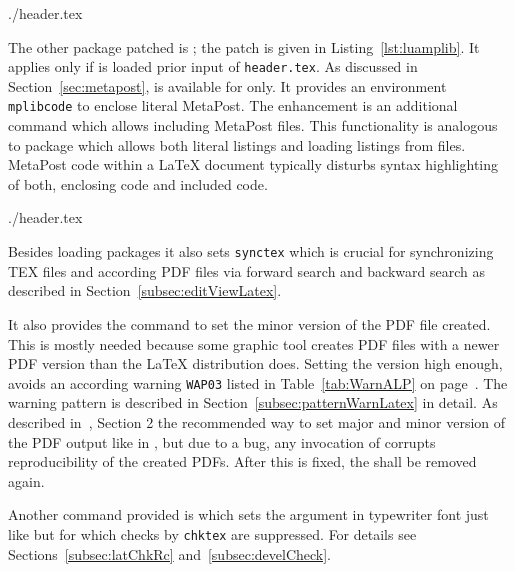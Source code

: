 %
{./header.tex}%


The other package patched is ; the patch is given in Listing~\ref{lst:luamplib}. 
It applies only if  is loaded prior input of \texttt{header.tex}. 
As discussed in Section~\ref{sec:metapost}, 
 is available for \lualatex{} only. 
It provides an environment \texttt{mplibcode} to enclose literal MetaPost. 
The enhancement is an additional command  
which allows including MetaPost files. 
This functionality is analogous to package  
which allows both literal listings and loading listings from files. 
MetaPost code within a \LaTeX{} document typically disturbs syntax highlighting 
of both, enclosing code and included code. 

%

{./header.tex}%

Besides loading packages it also sets \texttt{synctex} 
which is crucial for synchronizing TEX files and according PDF files 
via forward search and backward search 
as described in Section~\ref{subsec:editViewLatex}. 


It also provides the command  to set the minor version of the PDF file created. 
This is mostly needed because some graphic tool creates PDF files with a newer PDF version 
than the \LaTeX{} distribution does. 
Setting the version high enough, avoids an according warning \texttt{WAP03} 
listed in Table~\ref{tab:WarnALP} on page~\pageref{tab:WarnALP}. 
The warning pattern is described in Section~\ref{subsec:patternWarnLatex} in detail. 
As described in~\cite{DocMetaDataSuppCode}, Section 2 
the recommended way to set major and minor version of the PDF output 
like in , 
but due to a bug, any invocation of  corrupts reproducibility of the created PDFs. 
After this is fixed, the  shall be removed again. 

Another command provided is  which sets the argument in typewriter font 
just like  but for which checks by \texttt{chktex} are suppressed. 
For details see Sections~\ref{subsec:latChkRc} and~\ref{subsec:develCheck}. 
\medskip


